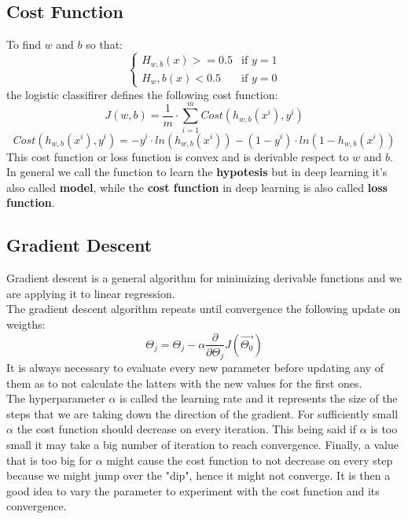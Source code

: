 \documentclass{article}
\begin{document}
\subsection{Cost Function}
To find $w$ and $b$ so that:
$$\begin{cases}
    H_{w,b}(x) >= 0.5 & \text{if } y=1\\
    H_w,b(x)<0.5 & \text{if } y=0
\end{cases}$$
the logistic classifirer defines the following cost function:
\begin{equation}
    J(w,b) = \frac{1}{m}\cdot \sum_{i=1}^{m}{Cost(h_{w,b}(x^i),y^i)}
\end{equation}
\begin{equation}
    Cost(h_{w,b}(x^i),y^i)= -y^i\cdot ln(h_{w,b}(x^i))-(1-y^i)\cdot ln(1-h_{w,b}(x^i))
\end{equation}
This cost function or loss function is convex and is derivable respect to $w$ and $b$.
In general we call the function to learn the \textbf{hypotesis} but in deep learning it's also called \textbf{model}, while the \textbf{cost function} in deep learning is also called \textbf{loss function}.

\subsection*{Gradient Descent}
Gradient descent is a general algorithm for minimizing derivable functions and we are applying it to linear regression.\\
The gradient descent algorithm repeats until convergence the following update on weigths:
\[ 
     \Theta_j = \Theta_j - \alpha \frac{\partial}{\partial\Theta_j}J(\vec{\Theta_0})
\]
It is always necessary to evaluate every new parameter before updating any of them as to not calculate the latters with the new values for the first ones.\\
The hyperparameter $\alpha$ is called the learning rate and it represents the size of the steps that we are taking down the direction of the gradient. For sufficiently small $\alpha$ the cost function should decrease on every iteration. This being said if $\alpha$ is too small it may take a big number of iteration to reach convergence. Finally, a value that is too big for $\alpha$ might cause the cost function to not decrease on every step because we might jump over the "dip", hence it might not converge. It is then a good idea to vary the parameter to experiment with the cost function and its convergence.
\end{document}
